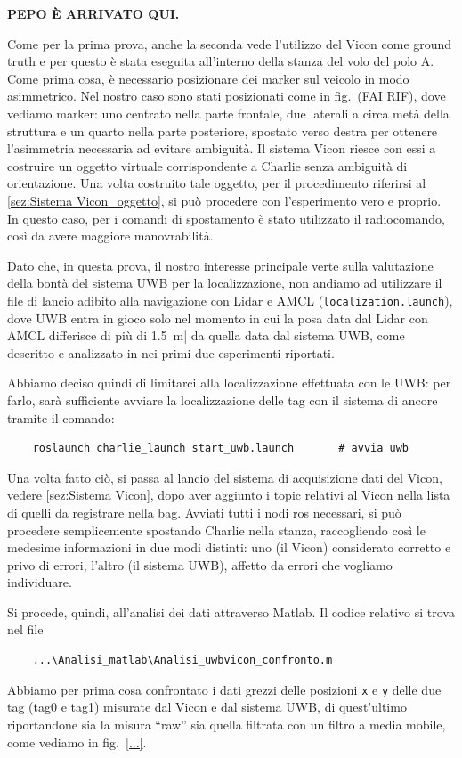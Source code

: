 \textbf{PEPO \`E ARRIVATO QUI.}


Come per la prima prova, anche la seconda vede l'utilizzo del Vicon come ground truth e per questo è stata eseguita all'interno della stanza del volo del polo A.
Come prima cosa, è necessario posizionare dei marker sul veicolo in modo asimmetrico. Nel nostro caso sono stati posizionati come in fig.~(FAI RIF), dove vediamo 
marker: uno centrato nella parte frontale, due laterali a circa metà della struttura e un quarto nella parte posteriore, spostato verso destra per ottenere 
l'asimmetria necessaria ad evitare ambiguità. Il sistema Vicon riesce con essi a costruire un oggetto virtuale corrispondente a Charlie senza ambiguità di orientazione. 
Una volta costruito tale oggetto, per il procedimento riferirsi al \ref{sez:Sistema Vicon_oggetto}, si può procedere con l'esperimento vero e proprio. In questo caso, 
per i comandi di spostamento è stato utilizzato il radiocomando, così da avere maggiore manovrabilità.

Dato che, in questa prova, il nostro interesse principale verte sulla valutazione della bontà del sistema UWB per la localizzazione, non andiamo ad utilizzare il file
di lancio adibito alla navigazione con Lidar e AMCL (\verb|localization.launch|), dove UWB entra in gioco solo nel momento in cui la posa data dal Lidar con AMCL differisce di più di \SI{1.5}{\metre}| da quella data dal sistema UWB, come descritto e analizzato in \cite{ptvlocalizzazione} nei primi due esperimenti riportati. 
 
Abbiamo deciso quindi di limitarci alla localizzazione effettuata con le UWB: per farlo, sarà sufficiente avviare la localizzazione delle tag con il sistema di 
ancore tramite il comando:
\begin{verbatim}
	roslaunch charlie_launch start_uwb.launch		# avvia uwb
\end{verbatim} 

Una volta fatto ciò, si passa al lancio del sistema di acquisizione dati del Vicon, vedere \ref{sez:Sistema Vicon}, dopo aver aggiunto i topic relativi al Vicon
nella lista di quelli da registrare nella bag. 
Avviati tutti i nodi ros necessari, si può procedere semplicemente spostando Charlie nella stanza, raccogliendo così le medesime informazioni in due modi distinti: 
uno (il Vicon) considerato corretto e privo di errori, l'altro (il sistema UWB), affetto da errori che vogliamo individuare.

Si procede, quindi, all'analisi dei dati attraverso Matlab. Il codice relativo si trova nel file
\begin{verbatim}
	...\Analisi_matlab\Analisi_uwbvicon_confronto.m
\end{verbatim}  
Abbiamo per prima cosa confrontato i dati grezzi delle posizioni \verb|x| e \verb|y| delle due tag (tag0 e tag1) misurate dal Vicon e dal sistema UWB, di quest'ultimo 
riportandone sia la misura ``raw'' sia quella filtrata con un filtro a media mobile, come vediamo in fig.~\ref{...}.

